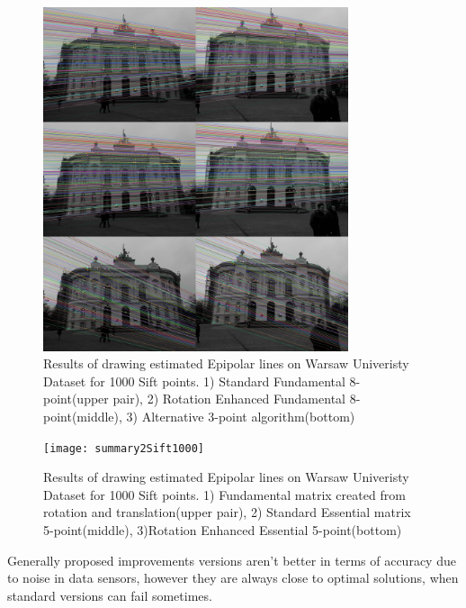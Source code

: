\begin{figure}[b!]
    \centering
    \includegraphics[width=0.8\textwidth]{summary1Sift1000}
    \caption{Results of drawing estimated Epipolar lines on Warsaw Univeristy Dataset for 1000 Sift points. 1) Standard Fundamental 8-point(upper pair), 2) Rotation Enhanced Fundamental 8-point(middle), 3) Alternative 3-point algorithm(bottom) }
    \label{fig:SummaryEpiLines11000}
\end{figure}
\begin{figure}[ht!]
    \centering
    \texttt{[image: summary2Sift1000]}
    \caption{Results of drawing estimated Epipolar lines on Warsaw Univeristy Dataset for 1000 Sift points. 1) Fundamental matrix created from rotation and translation(upper pair), 2) Standard Essential matrix 5-point(middle), 3)Rotation Enhanced Essential 5-point(bottom) }
    \label{fig:SummaryEpiLines21000}
\end{figure}
Generally proposed improvements versions aren't better in terms of accuracy due to noise in data sensors, however they are always close to optimal solutions, when standard versions can fail sometimes.
\clearpage

